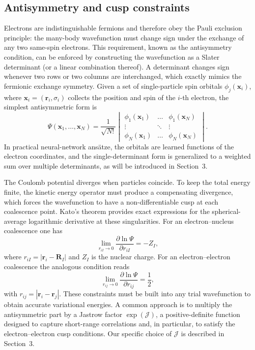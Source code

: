 \subsection{Antisymmetry and cusp constraints}

Electrons are indistinguishable fermions and therefore obey the Pauli exclusion principle: the many-body wavefunction must change sign under the exchange of any two same-spin electrons. This requirement, known as the antisymmetry condition, can be enforced by constructing the wavefunction as a Slater determinant (or a linear combination thereof). A determinant changes sign whenever two rows or two columns are interchanged, which exactly mimics the fermionic exchange symmetry. Given a set of single-particle spin orbitals $\phi_j(\mathbf{x}_i)$, where $\mathbf{x}_i=(\mathbf{r}_i,\sigma_i)$ collects the position and spin of the $i$-th electron, the simplest antisymmetric form is
\begin{equation}
	\Psi(\mathbf{x}_1,\dots,\mathbf{x}_N)=
	\frac{1}{\sqrt{N!}}
	\begin{vmatrix}
		\phi_{1}(\mathbf{x}_{1})  & \dots  &  \phi_{1}(\mathbf{x}_{N}) \\
		\vdots   &  \ddots  & \vdots  \\
		\phi_{N}(\mathbf{x}_{1}) & \dots & \phi_{N}(\mathbf{x}_{N})
	\end{vmatrix}.
\end{equation}
In practical neural-network ans\"atze, the orbitals are learned functions of the electron coordinates, and the single-determinant form is generalized to a weighted sum over multiple determinants, as will be introduced in Section~3.

The Coulomb potential diverges when particles coincide. To keep the total energy finite, the kinetic energy operator must produce a compensating divergence, which forces the wavefunction to have a non-differentiable cusp at each coalescence point. Kato's theorem \cite{Kato1957EigenfunctionsManyParticle} provides exact expressions for the spherical-average logarithmic derivative at these singularities. For an electron--nucleus coalescence one has
\begin{equation*}
	\lim_{r_{iI}\to 0}
	\frac{\partial \ln\Psi}{\partial r_{iI}} = -Z_I,
\end{equation*}
where $r_{iI}=|\mathbf{r}_i-\mathbf{R}_I|$ and $Z_I$ is the nuclear charge. For an electron--electron coalescence the analogous condition reads
\begin{equation*}
	\lim_{r_{ij}\to 0}
	\frac{\partial \ln\Psi}{\partial r_{ij}} = \frac{1}{2},
\end{equation*}
with $r_{ij}=|\mathbf{r}_i-\mathbf{r}_j|$. These constraints must be built into any trial wavefunction to obtain accurate variational energies. A common approach is to multiply the antisymmetric part by a Jastrow factor $\exp(\mathcal{J})$, a positive-definite function designed to capture short-range correlations and, in particular, to satisfy the electron--electron cusp conditions. Our specific choice of $\mathcal{J}$ is described in Section~3.


